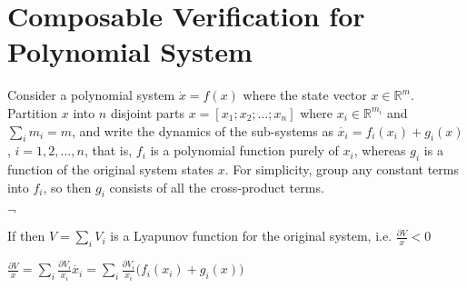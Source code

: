 \documentclass{article}
\begin{document}
\section{Composable Verification for Polynomial System} %
\label{sec:composable_verification_for_polynomial_system}
Consider a polynomial system $\dot x=f(x)$ where the state vector $x\in \mathbb{R}^m$. Partition $x$ into $n$ disjoint parts $x=[x_1;x_2;\dots;x_n]$ where $x_i \in \mathbb{R}^{m_i}$ and $\sum\limits_{i}{m_i}=m$, and write the dynamics of the sub-systems as $\dot{x_i}=f_i(x_i)+g_i(x)$, $i=1,2,\dots,n$, that is, $f_i$ is a polynomial function purely of $x_i$, whereas $g_i$ is a function of the original system states $x$. For simplicity, group any constant terms into $f_i$, so then $g_i$ consists of all the cross-product terms.

$\lnot$


If 
then $V=\sum\limits_{i}{V_i}$ is a Lyapunov function for the original system, i.e. $\frac{\partial{V}}{x}<0$

$\frac{\partial{V}}{x}=\sum\limits_{i}{\frac{\partial{V_i}}{x_i}\dot{x_i}}=\sum\limits_{i}{\frac{\partial{V_i}}{x_i}(f_i(x_i)+g_i(x)})$
\end{document}
